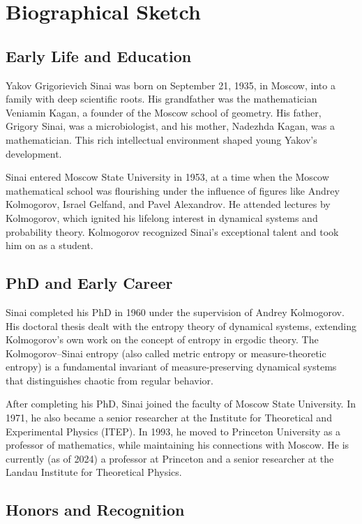 \section{Biographical Sketch}

\subsection{Early Life and Education}

Yakov Grigorievich Sinai was born on September 21, 1935, in Moscow, into a family with deep scientific roots. His grandfather was the mathematician Veniamin Kagan, a founder of the Moscow school of geometry. His father, Grigory Sinai, was a microbiologist, and his mother, Nadezhda Kagan, was a mathematician. This rich intellectual environment shaped young Yakov's development.

Sinai entered Moscow State University in 1953, at a time when the Moscow mathematical school was flourishing under the influence of figures like Andrey Kolmogorov, Israel Gelfand, and Pavel Alexandrov. He attended lectures by Kolmogorov, which ignited his lifelong interest in dynamical systems and probability theory. Kolmogorov recognized Sinai's exceptional talent and took him on as a student.

\subsection{PhD and Early Career}

Sinai completed his PhD in 1960 under the supervision of Andrey Kolmogorov. His doctoral thesis dealt with the entropy theory of dynamical systems, extending Kolmogorov's own work on the concept of entropy in ergodic theory. The Kolmogorov--Sinai entropy (also called metric entropy or measure-theoretic entropy) is a fundamental invariant of measure-preserving dynamical systems that distinguishes chaotic from regular behavior.

After completing his PhD, Sinai joined the faculty of Moscow State University. In 1971, he also became a senior researcher at the Institute for Theoretical and Experimental Physics (ITEP). In 1993, he moved to Princeton University as a professor of mathematics, while maintaining his connections with Moscow. He is currently (as of 2024) a professor at Princeton and a senior researcher at the Landau Institute for Theoretical Physics.

\subsection{Honors and Recognition}

